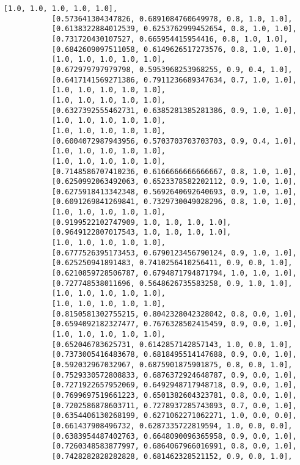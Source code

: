 \documentclass[11pt]{article}
\begin{document}
\begin{Verbatim}[commandchars=\\\{\}]
           [1.0, 1.0, 1.0, 1.0, 1.0],
           [0.573641304347826, 0.6891084760649978, 0.8, 1.0, 1.0],
           [0.6138322884012539, 0.6253762999452654, 0.8, 1.0, 1.0],
           [0.731720430107527, 0.665954415954416, 0.8, 1.0, 1.0],
           [0.6842609097511058, 0.6149626517273576, 0.8, 1.0, 1.0],
           [1.0, 1.0, 1.0, 1.0, 1.0],
           [0.672979797979798, 0.5953968253968255, 0.9, 0.4, 1.0],
           [0.6417141569271386, 0.7911236689347634, 0.7, 1.0, 1.0],
           [1.0, 1.0, 1.0, 1.0, 1.0],
           [1.0, 1.0, 1.0, 1.0, 1.0],
           [0.6327392555462731, 0.6385281385281386, 0.9, 1.0, 1.0],
           [1.0, 1.0, 1.0, 1.0, 1.0],
           [1.0, 1.0, 1.0, 1.0, 1.0],
           [0.6004072987943956, 0.5703703703703703, 0.9, 0.4, 1.0],
           [1.0, 1.0, 1.0, 1.0, 1.0],
           [1.0, 1.0, 1.0, 1.0, 1.0],
           [0.7148586707410236, 0.6166666666666667, 0.8, 1.0, 1.0],
           [0.6250992063492063, 0.6523378582202112, 0.9, 1.0, 1.0],
           [0.6275918413342348, 0.5692640692640693, 0.9, 1.0, 1.0],
           [0.6091269841269841, 0.7329730049028296, 0.8, 1.0, 1.0],
           [1.0, 1.0, 1.0, 1.0, 1.0],
           [0.9199522102747909, 1.0, 1.0, 1.0, 1.0],
           [0.9649122807017543, 1.0, 1.0, 1.0, 1.0],
           [1.0, 1.0, 1.0, 1.0, 1.0],
           [0.6777526395173453, 0.6790123456790124, 0.9, 1.0, 1.0],
           [0.625250941891483, 0.7410256410256411, 0.9, 0.0, 1.0],
           [0.6210859728506787, 0.6794871794871794, 1.0, 1.0, 1.0],
           [0.727748538011696, 0.5648626735583258, 0.9, 1.0, 1.0],
           [1.0, 1.0, 1.0, 1.0, 1.0],
           [1.0, 1.0, 1.0, 1.0, 1.0],
           [0.8150581302755215, 0.8042328042328042, 0.8, 0.0, 1.0],
           [0.6594092182327477, 0.7676328502415459, 0.9, 0.0, 1.0],
           [1.0, 1.0, 1.0, 1.0, 1.0],
           [0.652046783625731, 0.6142857142857143, 1.0, 0.0, 1.0],
           [0.7373005416483678, 0.6818495514147688, 0.9, 0.0, 1.0],
           [0.592032967032967, 0.6875901875901875, 0.8, 0.0, 1.0],
           [0.7529330572808833, 0.6876372924648787, 0.9, 0.0, 1.0],
           [0.7271922657952069, 0.6492948717948718, 0.9, 0.0, 1.0],
           [0.7699697519661223, 0.6501382604323781, 0.8, 0.0, 1.0],
           [0.7202586878603711, 0.7278937285743093, 0.7, 0.0, 1.0],
           [0.6354406130268199, 0.6271062271062271, 1.0, 0.0, 0.0],
           [0.661437908496732, 0.6287335722819594, 1.0, 0.0, 0.0],
           [0.6383954487402763, 0.6648090096365958, 0.9, 0.0, 1.0],
           [0.7260348583877997, 0.6864067966016991, 0.8, 0.0, 1.0],
           [0.7428282828282828, 0.681462328521152, 0.9, 0.0, 1.0],

\end{Verbatim}
\end{document}
